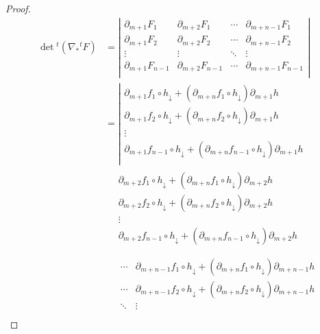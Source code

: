 \documentclass[dvipdfmx]{jsarticle}
\begin{document}
\begin{proof}
\begin{align*}
\det{{}^{t}\left( \nabla_{*}{}^{t}F \right)} &= \left| \begin{matrix}
\partial_{m + 1}F_{1} & \partial_{m + 2}F_{1} & \cdots & \partial_{m + n - 1}F_{1} \\
\partial_{m + 1}F_{2} & \partial_{m + 2}F_{2} & \cdots & \partial_{m + n - 1}F_{2} \\
 \vdots & \vdots & \ddots & \vdots \\
\partial_{m + 1}F_{n - 1} & \partial_{m + 2}F_{n - 1} & \cdots & \partial_{m + n - 1}F_{n - 1} \\
\end{matrix} \right|\\
&= \left| \begin{matrix}
\partial_{m + 1}f_{1} \circ h_{\downarrow} + \left( \partial_{m + n}f_{1} \circ h_{\downarrow} \right)\partial_{m + 1}h \\
\partial_{m + 1}f_{2} \circ h_{\downarrow} + \left( \partial_{m + n}f_{2} \circ h_{\downarrow} \right)\partial_{m + 1}h \\
 \vdots \\
\partial_{m + 1}f_{n - 1} \circ h_{\downarrow} + \left( \partial_{m + n}f_{n - 1} \circ h_{\downarrow} \right)\partial_{m + 1}h \\
\end{matrix} \right. \\
&\quad \begin{matrix}
\partial_{m + 2}f_{1} \circ h_{\downarrow} + \left( \partial_{m + n}f_{1} \circ h_{\downarrow} \right)\partial_{m + 2}h \\
\partial_{m + 2}f_{2} \circ h_{\downarrow} + \left( \partial_{m + n}f_{2} \circ h_{\downarrow} \right)\partial_{m + 2}h \\
 \vdots \\
\partial_{m + 2}f_{n - 1} \circ h_{\downarrow} + \left( \partial_{m + n}f_{n - 1} \circ h_{\downarrow} \right)\partial_{m + 2}h \\
\end{matrix} \\
&\quad \left. \ \begin{matrix}
\cdots & \partial_{m + n - 1}f_{1} \circ h_{\downarrow} + \left( \partial_{m + n}f_{1} \circ h_{\downarrow} \right)\partial_{m + n - 1}h \\
\cdots & \partial_{m + n - 1}f_{2} \circ h_{\downarrow} + \left( \partial_{m + n}f_{2} \circ h_{\downarrow} \right)\partial_{m + n - 1}h \\
 \ddots & \vdots \\

\end{matrix}
\end{align*}
\end{proof}
\end{document}

